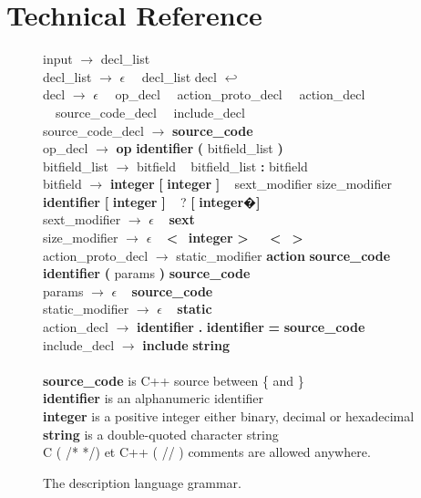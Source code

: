\newpage

\section{Technical Reference}

\begin{figure}[p]
input $\rightarrow$ decl\_list\\
decl\_list $\rightarrow$ $\epsilon$ \textbar~~decl\_list decl {\bf $\hookleftarrow$}\\
decl $\rightarrow$ $\epsilon$ \textbar~~op\_decl \textbar~~action\_proto\_decl \textbar~~action\_decl \textbar~~source\_code\_decl \textbar~~include\_decl\\
source\_code\_decl $\rightarrow$ {\bf source\_code}\\
op\_decl $\rightarrow$ {\bf op} {\bf identifier} {\bf (} bitfield\_list {\bf )}\\
bitfield\_list $\rightarrow$ bitfield \textbar~ bitfield\_list {\bf :} bitfield\\
bitfield $\rightarrow$ {\bf integer} {\bf [} {\bf integer} {\bf ]} \textbar~ sext\_modifier size\_modifier {\bf identifier} {\bf [} {\bf integer} {\bf ]} \textbar~ ? {\bf [} {\bf integer}�{\bf ]}\\
sext\_modifier $\rightarrow$ $\epsilon$ \textbar~ {\bf sext}\\
size\_modifier $\rightarrow$ $\epsilon$ \textbar~ {\bf \textless}~ {\bf integer} {\bf \textgreater}~ \textbar~ {\bf \textless}~ {\bf \textgreater}~\\
action\_proto\_decl $\rightarrow$ static\_modifier {\bf action} {\bf source\_code} {\bf identifier} {\bf (} params {\bf )} {\bf source\_code}\\
params $\rightarrow$ $\epsilon$ \textbar~ {\bf source\_code}\\
static\_modifier $\rightarrow$ $\epsilon$ \textbar~ {\bf static}\\
action\_decl $\rightarrow$ {\bf identifier} {\bf.} {\bf identifier} {\bf =} {\bf source\_code}\\
include\_decl $\rightarrow$ {\bf include} {\bf string}\\
\\
{\bf source\_code} is C++ source between \{ and \}\\
{\bf identifier} is an alphanumeric identifier\\
{\bf integer} is a positive integer either binary, decimal or hexadecimal\\
{\bf string} is a double-quoted character string\\
C ( /* */) et C++ ( // ) comments are allowed anywhere.
\caption{The description language grammar.}
\label{grammar}
\end{figure}
